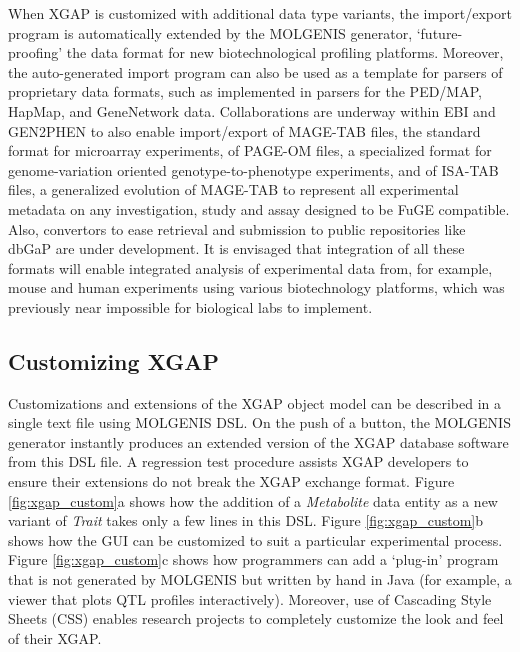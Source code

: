 When XGAP is customized with additional data type variants, the import/export program is automatically extended by the MOLGENIS generator, ‘future-proofing’ the data format for new biotechnological profiling platforms.
Moreover, the auto-generated import program can also be used as a template for parsers of proprietary data formats, such as implemented in parsers for the PED/MAP, HapMap, and GeneNetwork data.
Collaborations are underway within EBI and GEN2PHEN to also enable import/export of MAGE-TAB\cite{Rayner_2006} files, the standard format for microarray experiments, of PAGE-OM\cite{xgap_pageom} files, a specialized format for genome-variation oriented genotype-to-phenotype experiments, and of ISA-TAB\cite{xgap_gen2phen} files, a generalized evolution of MAGE-TAB to represent all experimental metadata on any investigation, study and assay designed to be FuGE compatible.
Also, convertors to ease retrieval and submission to public repositories like dbGaP are under development.
It is envisaged that integration of all these formats will enable integrated analysis of experimental data from, for example, mouse and human experiments using various biotechnology platforms, which was previously near impossible for biological labs to implement.

\subsection{Customizing XGAP}
Customizations and extensions of the XGAP object model can be described in a single text file using MOLGENIS\cite{Swertz_2007, Swertz_2004} DSL.
On the push of a button, the MOLGENIS generator instantly produces an extended version of the XGAP database software from this DSL file.
A regression test procedure assists XGAP developers to ensure their extensions do not break the XGAP exchange format.
Figure \ref{fig:xgap_custom}a shows how the addition of a \textsl{Metabolite} data entity as a new variant of \textsl{Trait} takes only a few lines in this DSL.
Figure \ref{fig:xgap_custom}b shows how the GUI can be customized to suit a particular experimental process.
Figure \ref{fig:xgap_custom}c shows how programmers can add a ‘plug-in’ program that is not generated by MOLGENIS but written by hand in Java (for example, a viewer that plots QTL profiles interactively).
Moreover, use of Cascading Style Sheets (CSS) enables research projects to completely customize the look and feel of their XGAP.

